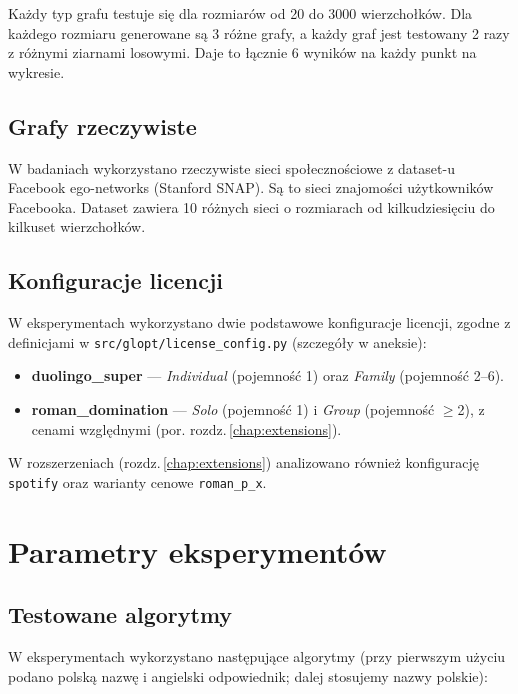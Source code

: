 Każdy typ grafu testuje się dla rozmiarów od 20 do 3000 wierzchołków. Dla każdego rozmiaru generowane są 3 różne grafy, a każdy graf jest testowany 2 razy z różnymi ziarnami losowymi. Daje to łącznie 6 wyników na każdy punkt na wykresie.

\subsection{Grafy rzeczywiste}

W badaniach wykorzystano rzeczywiste sieci społecznościowe z dataset-u Facebook ego-networks (Stanford SNAP). Są to sieci znajomości użytkowników Facebooka. Dataset zawiera 10 różnych sieci o rozmiarach od kilkudziesięciu do kilkuset wierzchołków.

\subsection{Konfiguracje licencji}

W eksperymentach wykorzystano dwie podstawowe konfiguracje licencji, zgodne z definicjami w \texttt{src/glopt/license\_config.py} (szczegóły w aneksie):

\begin{itemize}
  \item \textbf{duolingo\_super} — \emph{Individual} (pojemność 1) oraz \emph{Family} (pojemność 2–6).
  \item \textbf{roman\_domination} — \emph{Solo} (pojemność 1) i \emph{Group} (pojemność \(\ge\)2), z cenami względnymi (por. rozdz.\,\ref{chap:extensions}).
\end{itemize}

W rozszerzeniach (rozdz.\,\ref{chap:extensions}) analizowano również konfigurację \texttt{spotify} oraz warianty cenowe \texttt{roman\_p\_x}.

\section{Parametry eksperymentów}

\subsection{Testowane algorytmy}

W eksperymentach wykorzystano następujące algorytmy (przy pierwszym użyciu podano polską nazwę i angielski odpowiednik; dalej stosujemy nazwy polskie):

